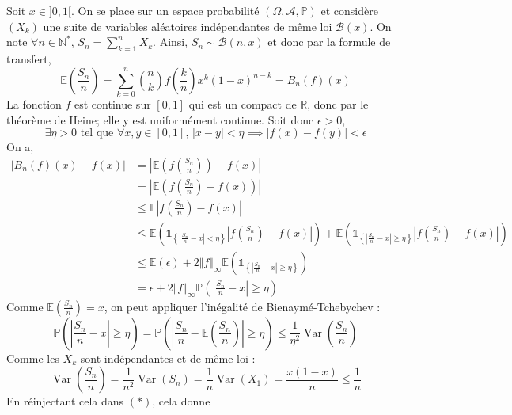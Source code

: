 	\begin{demonstration}
		Soit $x \in ]0, 1[$. On se place sur un espace probabilité $(\Omega, \mathcal{A}, \mathbb{P})$ et considère $(X_k)$ une suite de variables aléatoires indépendantes de même loi $\mathcal{B}(x)$. On note $\forall n \in \mathbb{N}^*$, $S_n = \sum_{k=1}^n X_k$. Ainsi, $S_n \sim \mathcal{B}(n, x)$ et donc par la formule de transfert,
		\[ \mathbb{E} \left( \frac{S_n}{n} \right) = \sum_{k=0}^n \binom{n}{k} f \left( \frac{k}{n} \right) x^k (1-x)^{n-k} = B_n(f)(x) \]
		La fonction $f$ est continue sur $[0,1]$ qui est un compact de $\mathbb{R}$, donc par le théorème de Heine; elle y est uniformément continue. Soit donc $\epsilon > 0$,
		\[ \exists \eta > 0 \text{ tel que } \forall x, y \in [0,1], \, |x-y| < \eta \implies |f(x) - f(y)| < \epsilon \]
		On a,
		\begin{align*}
			|B_n(f)(x) - f(x)| &= \left| \mathbb{E} \left( f \left( \frac{S_n}{n} \right) \right) - f(x) \right| \\
			&= \left| \mathbb{E} \left( f \left( \frac{S_n}{n} \right) - f(x) \right) \right| \\
			&\leq \mathbb{E} \left| f \left( \frac{S_n}{n} \right) - f(x) \right| \\
			&\leq \mathbb{E} \left( \mathbb{1}_{\left \{ \left| \frac{S_n}{n} - x \right| < \eta \right \}} \left| f \left( \frac{S_n}{n} \right) - f(x) \right| \right) + \mathbb{E} \left( \mathbb{1}_{\left \{ \left| \frac{S_n}{n} - x \right| \geq \eta \right \}} \left| f \left( \frac{S_n}{n} \right) - f(x) \right| \right) \\
			&\leq \mathbb{E} (\epsilon) + 2 \Vert f \Vert_\infty \mathbb{E} \left( \mathbb{1}_{\left \{ \left| \frac{S_n}{n} - x \right| \geq \eta \right \}} \right) \\
			&= \epsilon + 2 \Vert f \Vert_\infty \mathbb{P} \left( \left| \frac{S_n}{n} - x \right| \geq \eta \right) \tag{$*$}
		\end{align*}
		Comme $\mathbb{E} \left( \frac{S_n}{n} \right) = x$, on peut appliquer l'inégalité de Bienaymé-Tchebychev :
		\[ \mathbb{P} \left( \left| \frac{S_n}{n} - x \right| \geq \eta \right) = \mathbb{P} \left( \left| \frac{S_n}{n} - \mathbb{E} \left( \frac{S_n}{n} \right) \right| \geq \eta \right) \leq \frac{1}{\eta^2} \operatorname{Var} \left( \frac{S_n}{n} \right) \]
		Comme les $X_k$ sont indépendantes et de même loi :
		\[ \operatorname{Var} \left( \frac{S_n}{n} \right) = \frac{1}{n^2} \operatorname{Var} (S_n) = \frac{1}{n} \operatorname{Var}(X_1) = \frac{x(1-x)}{n} \leq \frac{1}{n} \]
		En réinjectant cela dans $(*)$, cela donne

\end{demonstration}
